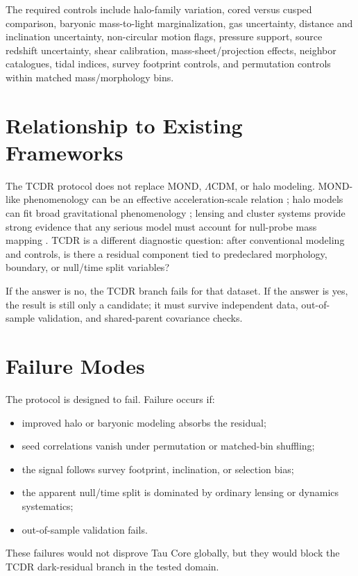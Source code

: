 \documentclass[11pt]{article}
\begin{document}
The required controls include halo-family variation, cored versus cusped
comparison, baryonic mass-to-light marginalization, gas uncertainty, distance
and inclination uncertainty, non-circular motion flags, pressure support,
source redshift uncertainty, shear calibration, mass-sheet/projection effects,
neighbor catalogues, tidal indices, survey footprint controls, and
permutation controls within matched mass/morphology bins.

\section{Relationship to Existing Frameworks}

The TCDR protocol does not replace MOND, \(\Lambda\)CDM, or halo modeling.
MOND-like phenomenology can be an effective acceleration-scale relation
\cite{Milgrom1983}; halo models can fit broad gravitational phenomenology
\cite{Navarro1996,Burkert1995}; lensing and cluster systems provide strong
evidence that any serious model must account for null-probe mass mapping
\cite{Clowe2006,Mandelbaum2018}.  TCDR is a different diagnostic question:
after conventional modeling and controls, is there a residual component tied
to predeclared morphology, boundary, or null/time split variables?

If the answer is no, the TCDR branch fails for that dataset.  If the answer is
yes, the result is still only a candidate; it must survive independent data,
out-of-sample validation, and shared-parent covariance checks.

\section{Failure Modes}

The protocol is designed to fail.  Failure occurs if:
\begin{itemize}
  \item improved halo or baryonic modeling absorbs the residual;
  \item seed correlations vanish under permutation or matched-bin shuffling;
  \item the signal follows survey footprint, inclination, or selection bias;
  \item the apparent null/time split is dominated by ordinary lensing or
  dynamics systematics;
  \item out-of-sample validation fails.
\end{itemize}
These failures would not disprove Tau Core globally, but they would block the
TCDR dark-residual branch in the tested domain.
\end{document}
